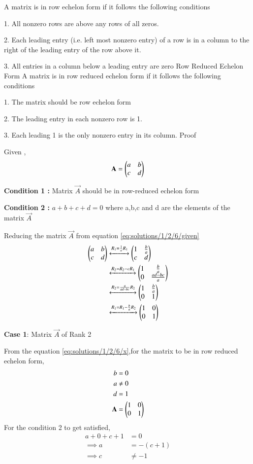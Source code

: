A matrix is in row echelon  form if it follows the following conditions

1. All nonzero rows are above any rows of all zeros.

2. Each leading entry (i.e. left most nonzero entry) of a row is in a column to the right of the leading entry of the row above it.

3. All entries in a column below a leading entry are zero
{Row Reduced Echelon Form}
A matrix is in row reduced echelon form if it follows the following conditions

1. The matrix should be row echelon form 

2. The leading entry in each nonzero row is 1.

3. Each leading 1 is the only nonzero entry in its column.
{Proof}

Given ,
\begin{align}
    \mathbf{A}=\begin{pmatrix}a & b \\c & d\end{pmatrix}\label{eq:solutions/1/2/6/given}
\end{align}

\textbf{Condition 1 :} Matrix $\vec{A}$ should be in row-reduced echelon form 

\textbf{Condition 2 :}  $a+b+c+d=0$ where a,b,c and d are the elements of the matrix $\vec{A}$

Reducing the matrix $\vec{A}$ from equation \eqref{eq:solutions/1/2/6/given}
\begin{align}
\begin{pmatrix}a&b\\c&d\end{pmatrix}&\xleftrightarrow{R_1=\frac{1}{a}R_1}\begin{pmatrix}1&\frac{b}{a}\\c&d\end{pmatrix}\\
&\xleftrightarrow{R_2 = R_2-cR_1}\begin{pmatrix}1&\frac{b}{a}\\0&\frac{ad-bc}{a}\end{pmatrix}\label{eq:solutions/1/2/6/x}\\
&\xleftrightarrow{R_2 = \frac{a}{ad-bc}R_2}\begin{pmatrix}1&\frac{b}{a}\\0&1\end{pmatrix}\\
&\xleftrightarrow{R_1 = R_1-\frac{b}{a}R_2}\begin{pmatrix}1&0\\0&1\end{pmatrix}\label{eq:solutions/1/2/6/change}
\end{align}

\textbf{Case 1}: Matrix $\vec{A}$ of Rank 2

From the equation \eqref{eq:solutions/1/2/6/x},for the matrix to be in row reduced echelon form,
\begin{align}
    b&=0\notag\\
    a&\not=0\notag\\
    d&=1\notag\\
    \mathbf{A}&=\begin{pmatrix}1 & 0 \\ 0 & 1\end{pmatrix}\label{eq:solutions/1/2/6/r2}
\end{align}
For the condition 2 to get satisfied,
\begin{align}
    a+0+c+1&=0\\
    \implies a&=-(c+1)\\
    \implies c&\not=-1
\end{align}

